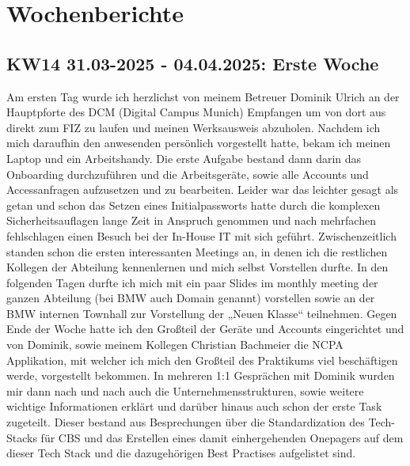 \section{Wochenberichte}
\subsection{KW14 31.03-2025 - 04.04.2025: Erste Woche}
Am ersten Tag wurde ich herzlichst von meinem Betreuer Dominik Ulrich an der Hauptpforte des \ac{DCM} (Digital Campus Munich) Empfangen um von dort aus direkt zum \ac{FIZ} zu laufen und meinen Werksausweis abzuholen. 
Nachdem ich mich daraufhin den anwesenden persönlich vorgestellt hatte, bekam ich meinen Laptop und ein Arbeitshandy. 
Die erste Aufgabe bestand dann darin das Onboarding durchzuführen und die Arbeitsgeräte, sowie alle Accounts und Accessanfragen aufzusetzen und zu bearbeiten. 
Leider war das leichter gesagt als getan und schon das Setzen eines Initialpassworts hatte durch die komplexen Sicherheitsauflagen lange Zeit in Anspruch genommen und nach mehrfachen fehlschlagen einen Besuch bei der In-House IT mit sich geführt. 
Zwischenzeitlich standen schon die ersten interessanten Meetings an, in denen ich die restlichen Kollegen der Abteilung kennenlernen und mich selbst Vorstellen durfte. 
In den folgenden Tagen durfte ich mich mit ein paar Slides im monthly meeting der ganzen Abteilung (bei BMW auch Domain genannt) vorstellen sowie an der BMW internen Townhall zur Vorstellung der „Neuen Klasse“ teilnehmen. 
Gegen Ende der Woche hatte ich den Großteil der Geräte und Accounts eingerichtet und von Dominik, sowie meinem Kollegen Christian Bachmeier die \ac{NCPA} Applikation, mit welcher ich mich den Großteil des Praktikums viel beschäftigen werde, vorgestellt bekommen. 
In mehreren 1:1 Gesprächen mit Dominik wurden mir dann nach und nach auch die Unternehmensstrukturen, sowie weitere wichtige Informationen erklärt und darüber hinaus auch schon der erste Task zugeteilt. 
Dieser bestand aus Besprechungen über die Standardization des Tech-Stacks für \ac{CBS} und das Erstellen eines damit einhergehenden Onepagers auf dem dieser Tech Stack und die dazugehörigen Best Practises aufgelistet sind.



